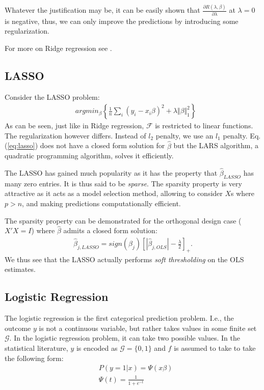\documentclass[12pt,a4paper]{article}
\theoremstyle{plain}
\theoremstyle{definition}
\newcommand{\norm}[1]{\Vert #1 \Vert}
\newcommand{\risk}{R}
\newcommand{\deriv}[2]{\frac{\partial #1}{\partial #2}}
\newcommand{\argmin}[2]{argmin_{#1}\left\{ #2 \right\}}
\newcommand{\hyp}{f}
\newcommand{\hypclass}{\mathcal{F}}
\newcommand{\categories}{\mathcal{G}}
\begin{document}
Whatever the justification may be, it can be easily shown that $\deriv{\risk(\lambda,\beta)}{\lambda}$ at $\lambda=0$ is negative, thus, we can only improve the predictions by introducing some regularization.


For more on Ridge regression see \cite{hastie_elements_2003}.


\subsection{LASSO}
Consider the LASSO problem:
\begin{align}
\label{eq:lasso}
	& \argmin{\beta}{\frac{1}{n}\sum_i (y_i-x_i\beta)^2 + \lambda \norm{\beta}^2_1} 
\end{align}
As can be seen, just like in Ridge regression, $\hypclass$ is restricted to linear functions. The regularization however differs. Instead of $l_2$ penalty, we use an $l_1$ penalty.
Eq.(\ref{eq:lasso}) does not have a closed form solution for $\hat{\beta}$ but the LARS algorithm, a quadratic programming algorithm, solves it efficiently.



The LASSO has gained much popularity as it has the property that $\hat{\beta}_{LASSO}$ has many zero entries. It is thus said to be \emph{sparse}.
The sparsity property is very attractive as it acts as a model selection method, allowing to consider $X$s where $p>n$, and making predictions computationally efficient.

The sparsity property can be demonstrated for the orthogonal design case ($X'X=I$) where $\hat{\beta}$ admits a closed form solution:
\begin{align}
	\hat{\beta}_{j,LASSO} = sign(\beta_j) \left[|\hat{\beta}_{j,OLS}|-\frac{\lambda}{2} \right]_+.
\end{align}
We thus see that the LASSO actually performs \emph{soft thresholding} on the OLS estimates. 




\subsection{Logistic Regression}
The logistic regression is the first categorical prediction problem. 
I.e., the outcome $y$ is not a continuous variable, but rather takes values in some finite set $\categories$. In the logistic regression problem, it can take two possible values.
In the statistical literature, $y$ is encoded as $\categories=\{0,1\}$ and $\hyp$ is assumed to take to take the following form:
\begin{align}
	& P(y=1|x) = \Psi(x\beta) \\
	& \Psi(t) = \frac{1}{1+e^{-t}}
\end{align}
\end{document}
